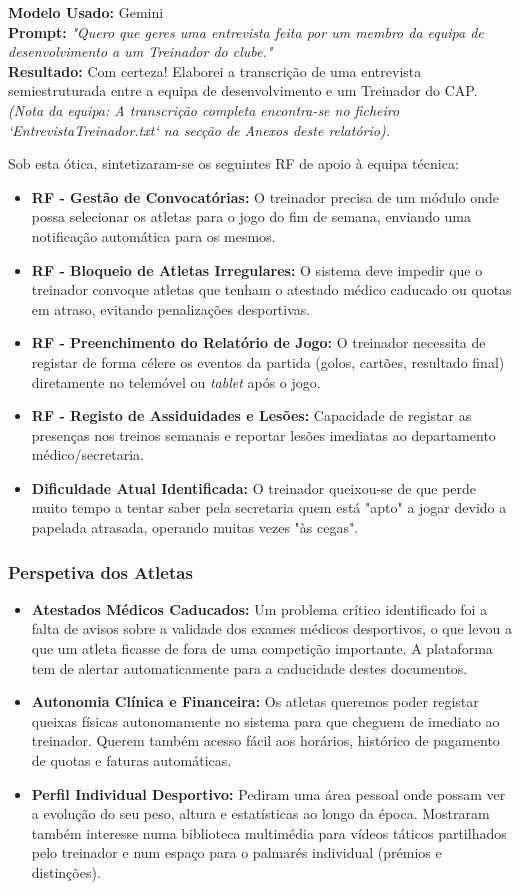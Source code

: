 \documentclass[a4paper,12pt]{scrreprt}
\newcommand{\caixaprompt}[3]{
    \begin{tcolorbox}[
        enhanced,
        colback=azulclaro,      %
        colframe=blue!50!black, %
        arc=2mm,                %
        boxrule=0.5mm,          %
        title=\textbf{Documentação de IA}, %
        fonttitle=\sffamily,
        coltitle=black,
        attach title to upper,
        after title={\par\medskip},
    ]
        \textbf{Modelo Usado:} #1 \\
        \textbf{Prompt:} \textit{"#2"} \\
        \tcbline %
        \textbf{Resultado:} #3
    \end{tcolorbox}
}
\begin{document}
{\caixaprompt{Gemini}{Quero que geres uma entrevista feita por um membro da equipa de desenvolvimento a um Treinador do clube.}{Com certeza! Elaborei a transcrição de uma entrevista semiestruturada entre a equipa de desenvolvimento e um Treinador do CAP. \textit{(Nota da equipa: A transcrição completa encontra-se no ficheiro `EntrevistaTreinador.txt` na secção de Anexos deste relatório).}}

Sob esta ótica, sintetizaram-se os seguintes RF de apoio à equipa técnica:

\begin{itemize}
    \item \textbf{RF - Gestão de Convocatórias:} O treinador precisa de um módulo onde possa selecionar os atletas para o jogo do fim de semana, enviando uma notificação automática para os mesmos.
    \item \textbf{RF - Bloqueio de Atletas Irregulares:} O sistema deve impedir que o treinador convoque atletas que tenham o atestado médico caducado ou quotas em atraso, evitando penalizações desportivas.
    \item \textbf{RF - Preenchimento do Relatório de Jogo:} O treinador necessita de registar de forma célere os eventos da partida (golos, cartões, resultado final) diretamente no telemóvel ou \textit{tablet} após o jogo.
    \item \textbf{RF - Registo de Assiduidades e Lesões:} Capacidade de registar as presenças nos treinos semanais e reportar lesões imediatas ao departamento médico/secretaria.
    \item \textbf{Dificuldade Atual Identificada:} O treinador queixou-se de que perde muito tempo a tentar saber pela secretaria quem está "apto" a jogar devido a papelada atrasada, operando muitas vezes "às cegas".
\end{itemize}

\subsubsection*{Perspetiva dos Atletas}
\begin{itemize}
    \item \textbf{Atestados Médicos Caducados:} Um problema crítico identificado foi a falta de avisos sobre a validade dos exames médicos desportivos, o que levou a que um atleta ficasse de fora de uma competição importante. A plataforma tem de alertar automaticamente para a caducidade destes documentos.
    \item \textbf{Autonomia Clínica e Financeira:} Os atletas queremos poder registar queixas físicas autonomamente no sistema para que cheguem de imediato ao treinador. Querem também acesso fácil aos horários, histórico de pagamento de quotas e faturas automáticas.
    \item \textbf{Perfil Individual Desportivo:} Pediram uma área pessoal onde possam ver a evolução do seu peso, altura e estatísticas ao longo da época. Mostraram também interesse numa biblioteca multimédia para vídeos táticos partilhados pelo treinador e num espaço para o palmarés individual (prémios e distinções).
\end{itemize}

}
\end{document}
